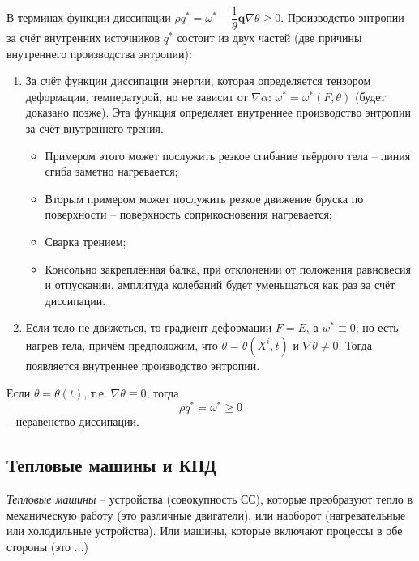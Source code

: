В терминах функции диссипации $\rho q^* = \omega^* - \dfrac{1}{\theta} \mathbf{q} \nabla \theta \geqslant 0$. Производство энтропии за счёт внутренних источников $q^*$ состоит из двух частей
(две причины внутреннего производства энтропии):
\begin{enumerate}
  \item За счёт функции диссипации энергии, которая определяется тензором деформации, температурой,
    но не зависит от $\nabla \alpha$: $\omega^* = \omega^* ( F, \theta )$ (будет доказано 
    позже). Эта функция определяет внутреннее производство энтропии за счёт внутреннего трения.
    \begin{itemize}
      \item Примером этого может послужить резкое сгибание твёрдого тела -- линия сгиба заметно
        нагревается;
      \item Вторым примером может послужить резкое движение бруска по поверхности -- поверхность 
        соприкосновения нагревается;
      \item Сварка трением;
      \item Консольно закреплённая балка, при отклонении от положения равновесия и отпускании,
        амплитуда колебаний будет уменьшаться как раз за счёт диссипации.
    \end{itemize}
    
  \item Если тело не движеться, то градиент деформации $F = E$, а $w^* \equiv 0$; но есть нагрев
    тела, причём предположим, что $\theta = \theta (X^i, t)$ и $\nabla \theta \neq 0$. Тогда
    появляется внутреннее производство энтропии.
\end{enumerate}

Если $\theta = \theta(t)$, т.е. $\nabla \theta \equiv 0$, тогда 
\[
  \rho q^* = \omega^* \geqslant 0
\]
-- неравенство диссипации.

\subsection{Тепловые машины и КПД}

\begin{definition}
  \emph{Тепловые машины} -- устройства (совокупность СС), которые преобразуют тепло в механическую
  работу (это различные двигатели), или наоборот (нагревательные или холодильные устройства).
  Или машины, которые включают процессы в обе стороны (это $\dots$)
\end{definition}

